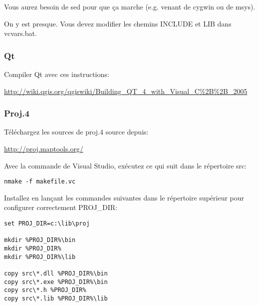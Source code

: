 % 

Vous aurez besoin de sed pour que ça marche (e.g. venant de cygwin ou de msys).

On y est presque. Vous devez modifier les chemins INCLUDE et LIB dans vcvars.bat.

\subsubsection{Qt}
Compiler Qt avec ces instructions:

\url{
http://wiki.qgis.org/qgiswiki/Building\_QT\_4\_with\_Visual\_C\%2B\%2B\_2005}

% 
% 
% 
% 

\subsubsection{Proj.4}
Téléchargez les sources de proj.4 source depuis:

\url{http://proj.maptools.org/}

Avec la commande de Visual Studio, exécutez ce qui suit dans le répertoire src:

\begin{verbatim}
nmake -f makefile.vc
\end{verbatim}

Installez en lançant les commandes suivantes dans le répertoire supérieur pour configurer correctement PROJ\_DIR:

\begin{verbatim}
set PROJ_DIR=c:\lib\proj

mkdir %PROJ_DIR%\bin
mkdir %PROJ_DIR%
mkdir %PROJ_DIR%\lib

copy src\*.dll %PROJ_DIR%\bin
copy src\*.exe %PROJ_DIR%\bin
copy src\*.h %PROJ_DIR%
copy src\*.lib %PROJ_DIR%\lib 
\end{verbatim}

